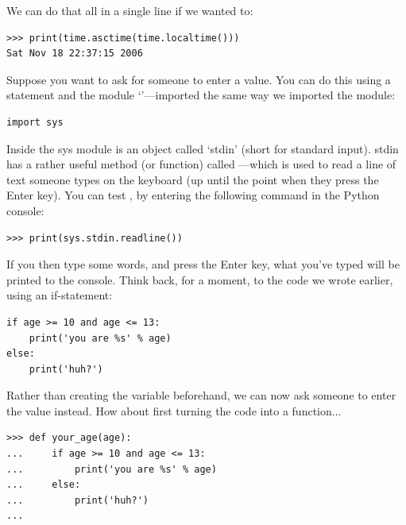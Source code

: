 \noindent
We can do that all in a single line if we wanted to:

\begin{listingignore}
\begin{verbatim}
>>> print(time.asctime(time.localtime()))
Sat Nov 18 22:37:15 2006
\end{verbatim}
\end{listingignore}

Suppose you want to ask for someone to enter a value. You can do this using a  statement and the module `'---imported the same way we imported the  module:

\begin{listing}
\begin{verbatim}
import sys
\end{verbatim}
\end{listing}

Inside the sys module is an object called `stdin' (short for standard input).  stdin has a rather useful method (or function) called ---which is used to read a line of text someone types on the keyboard (up until the point when they press the Enter key).  You can test , by entering the following command in the Python console:

\begin{listing}
\begin{verbatim}
>>> print(sys.stdin.readline())
\end{verbatim}
\end{listing}

If you then type some words, and press the Enter key, what you've typed will be printed to the console. Think back, for a moment, to the code we wrote earlier, using an if-statement:

\begin{listing}
\begin{verbatim}
if age >= 10 and age <= 13:
    print('you are %s' % age)
else:
    print('huh?')
\end{verbatim}
\end{listing}

Rather than creating the variable  beforehand, we can now ask someone to enter the value instead.  How about first turning the code into a function$\ldots$

\begin{listing}
\begin{verbatim}
>>> def your_age(age):
...     if age >= 10 and age <= 13:
...         print('you are %s' % age)
...     else:
...         print('huh?')
... 
\end{verbatim}
\end{listing}

